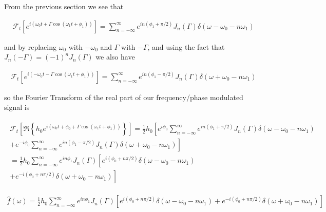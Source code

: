 \documentclass[onecolumn, groupedaddress, 10pt]{revtex4-1}
\begin{document}
From the previous section we see that

\begin{align}
\mathcal{F}_t \left[ e^{i(\omega_0 t + \Gamma \cos(\omega_1 t + \phi_1))} \right] 
= \sum_{n=-\infty}^{\infty} e^{in(\phi_1 + \pi/2)} J_n(\Gamma)  \delta(\omega - \omega_0 - n\omega_1)
\end{align}

and by replacing $\omega_0$ with $-\omega_0$ and $\Gamma$ with $-\Gamma$, and using the fact that $J_n(-\Gamma) = (-1)^n J_n (\Gamma)$ we also have

\begin{align}
\mathcal{F}_t \left[ e^{i(-\omega_0 t - \Gamma \cos(\omega_1 t + \phi_1))} \right] 
= \sum_{n=-\infty}^{\infty} e^{in(\phi_1 - \pi/2)} J_n(\Gamma)  \delta(\omega + \omega_0 - n\omega_1)
\end{align}

so the Fourier Transform of the real part of our frequency/phase modulated signal is

\begin{align}
\begin{split}
\mathcal{F}_t \left[ \Re \left\{ h_0 e^{i\left( \omega_0 t + \phi_0 + \Gamma \cos( \omega_1 t + \phi_1 ) \right)} \right\} \right]
= \frac{1}{2} h_0 \left[ e^{ i\phi_0} \sum_{n=-\infty}^{\infty} e^{in(\phi_1 + \pi/2)} J_n(\Gamma)  \delta(\omega - \omega_0 - n\omega_1) \right.	\\
+ \left. e^{-i\phi_0} \sum_{n=-\infty}^{\infty} e^{in(\phi_1 - \pi/2)} J_n(\Gamma)  \delta(\omega + \omega_0 - n\omega_1) \right]					\\
= \frac{1}{2} h_0 \sum_{n=-\infty}^{\infty} e^{in\phi_1} J_n (\Gamma) \left[ e^{i(\phi_0 + n\pi/2)} \delta(\omega - \omega_0 - n\omega_1) \right.	\\
+ \left. e^{-i(\phi_0 + n\pi/2)} \delta(\omega + \omega_0 - n\omega_1) \right]
\end{split}
\end{align}



\begin{align}
\label{eqn:realFourierTransform}
\hat{f}(\omega) = 
\frac{1}{2} h_0 \sum_{n=-\infty}^{\infty} e^{in\phi_1} J_n (\Gamma) \left[ e^{i(\phi_0 + n\pi/2)} \delta(\omega - \omega_0 - n\omega_1)
+ e^{-i(\phi_0 + n\pi/2)} \delta(\omega + \omega_0 - n\omega_1) \right]
\end{align}
\end{document}

